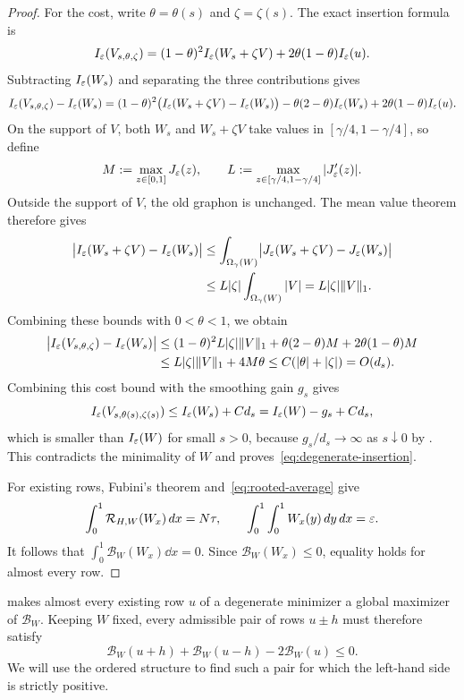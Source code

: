 \begin{proof}
For the cost, write $\theta=\theta(s)$ and $\zeta=\zeta(s)$. The exact
insertion formula is
\[
  I_\varepsilon(V_{s,\theta,\zeta})
    =(1-\theta)^2I_\varepsilon(W_s+\zeta V)
      +2\theta(1-\theta)I_\varepsilon(u).
\]
Subtracting $I_\varepsilon(W_s)$ and separating the three contributions gives
\[
  I_\varepsilon(V_{s,\theta,\zeta})-I_\varepsilon(W_s)
  =(1-\theta)^2\bigl(I_\varepsilon(W_s+\zeta V)-I_\varepsilon(W_s)\bigr)
  -\theta(2-\theta)I_\varepsilon(W_s)+2\theta(1-\theta)I_\varepsilon(u).
\]
On the support of $V$, both $W_s$ and $W_s+\zeta V$ take
values in $[\gamma/4,1-\gamma/4]$, so define
\[
  M:=\max_{z\in[0,1]}J_\varepsilon(z),\qquad
  L:=\max_{z\in[\gamma/4,1-\gamma/4]}|J_\varepsilon'(z)|.
\]
Outside the support of $V$, the old graphon is unchanged. The mean
value theorem therefore gives
\begin{align*}
  \bigl|I_\varepsilon(W_s+\zeta V)-I_\varepsilon(W_s)\bigr|
  &\le\int_{\Omega_\gamma(W)}
    \bigl|J_\varepsilon(W_s+\zeta V)-J_\varepsilon(W_s)\bigr|\\
  &\le L|\zeta|\int_{\Omega_\gamma(W)}|V|
   =L|\zeta|\|V\|_1.
\end{align*}
Combining these bounds with $0<\theta<1$, we obtain
\begin{align*}
  \bigl|I_\varepsilon(V_{s,\theta,\zeta})-I_\varepsilon(W_s)\bigr|
  &\le(1-\theta)^2L|\zeta|\|V\|_1+\theta(2-\theta)M+2\theta(1-\theta)M\\
  &\le L|\zeta|\|V\|_1+4M\theta
   \le C(|\theta|+|\zeta|)
   = O(d_s).
\end{align*}
Combining this cost bound with the smoothing gain $g_s$ gives
\[
  I_\varepsilon(V_{s,\theta(s),\zeta(s)})
  \le I_\varepsilon(W_s) + Cd_s
  =I_\varepsilon(W)-g_s+ Cd_s,
\]
which is smaller than $I_\varepsilon(W)$ for small $s>0$, because
$g_s/d_s\to\infty$ as $s\downarrow0$ by .
This contradicts the minimality of $W$ and proves~\eqref{eq:degenerate-insertion}.

For existing rows, Fubini's theorem and~\eqref{eq:rooted-average} give
\[
  \int_0^1\mathcal R_{H,W}(W_x)\,d x=N\tau,
  \qquad \int_0^1\int_0^1W_x(y)\,d y\,d x=\varepsilon.
\]
It follows that $\int_0^1\mathcal B_W(W_x)\dd x=0$.
Since $\mathcal B_W(W_x)\le0$, equality holds for almost every row.
\end{proof}

 makes almost every existing row $u$ of a
degenerate minimizer a global maximizer of $\mathcal B_W$. Keeping $W$
fixed, every admissible pair of rows $u\pm h$ must therefore satisfy
\[
  \mathcal B_W(u+h)+\mathcal B_W(u-h)-2\mathcal B_W(u)\le0.
\]
We will use the ordered structure to find such a pair for which the
left-hand side is strictly positive.

